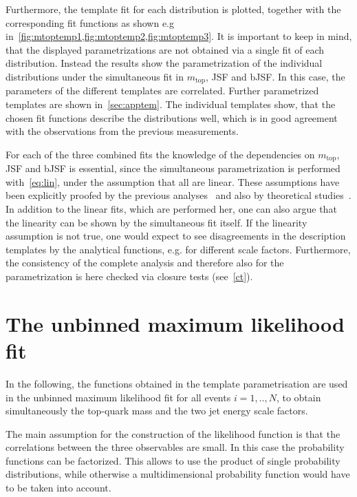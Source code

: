 Furthermore, the template fit for each distribution is plotted, together with the corresponding fit functions as shown e.g in~\cref{fig:mtoptemp1,fig:mtoptemp2,fig:mtoptemp3}. It is important to keep in mind, that the displayed parametrizations are not obtained via a single fit of each distribution. Instead the results show the parametrization of the individual distributions under the simultaneous fit in $m_{\text{top}}$, JSF and bJSF. In this case, the parameters of the different templates are correlated. Further parametrized templates are shown in~\cref{sec:apptem}. The individual templates show, that the chosen fit functions describe the distributions well, which is in good agreement with the observations from the previous measurements.

For each of the three combined fits the knowledge of the dependencies on $m_{\text{top}}$, JSF and bJSF is essential, since the simultaneous parametrization is performed with~\cref{eq:lin}, under the assumption that all  are linear. 
These assumptions have been explicitly proofed by the previous analyses~\cite{Aad:2015nba,ATLAS-CONF-2017-071}  and also by theoretical studies~\cite{Heinrich:2017bqp}. In addition to the linear fits, which are performed her, one can also argue that the linearity can be shown by the simultaneous fit itself.  If the linearity assumption is not true, one would expect to see disagreements in the description  templates by the analytical functions, e.g. for different scale factors. Furthermore, the consistency of the complete analysis and therefore also for the parametrization is here checked via closure tests (see~\cref{ct}).




 
 




\section{The unbinned maximum likelihood fit}
In the following, the functions obtained in the template parametrisation are used in the unbinned maximum likelihood fit
for all events $i = 1,..,N$, to obtain simultaneously the top-quark mass and the two jet energy scale factors. 

 The main assumption for the construction of the likelihood function is that the correlations between the three observables are small. In this case the probability  functions can be factorized. This allows to use the product of single probability distributions, while otherwise a multidimensional probability function would have to be taken into account.



